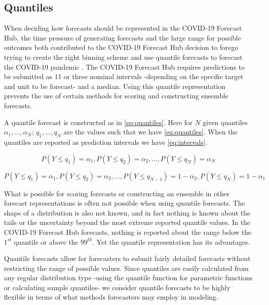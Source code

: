 \documentclass[11pt,notitlepage]{isuthesis}
\begin{document}
\subsection{Quantiles}
When deciding how forecasts should be represented in the COVID-19 Forecast Hub,
the time pressure of generating forecasts and the large
range for possible outcomes both contributed to the COVID-19 Forecast Hub 
decision
to forego trying to create the right binning scheme and use quantile forecasts
to forecast the COVID-19 pandemic \cite[]{bracher2021evaluating}.
The COVID-19 Forecast Hub requires predictions to be submitted as 11 or three 
nominal 
intervals -depending on the specific target and unit to be forecast- 
and a median.
Using this quantile representation prevents the use of certain methods for 
scoring and constructing ensemble forecasts.

A quantile forecast is constructed as in \eqref{eq:quantiles}.
Here for $N$ given quantiles $\alpha_1,..., \alpha_N$; $q_1,..., q_N$ are the 
values such that we have \eqref{eq:quantiles}. 
When the quantiles are reported as prediction intervals we have 
\eqref{eq:intervals}.

\begin{equation}
\label{eq:quantiles}
  P(Y \leq q_1) = \alpha_1, P(Y \leq q_2) = \alpha_2, ..., 
  P(Y \leq q_N) = \alpha_N
\end{equation}


\begin{equation}
\label{eq:intervals}
  P(Y \leq q_1) = \alpha_1, P(Y \leq q_2) = \alpha_2, ...,
  P(Y \leq q_{N-1}) = 1 - \alpha_2, P(Y \leq q_N) = 1 - \alpha_1
\end{equation}

What is possible for scoring forecasts
or constructing an ensemble in other forecast representations is often not 
possible when using
quantile forecasts. The shape of a distribution is also not known, and in fact
nothing is known about the tails or the uncertainty beyond the most 
extreme reported quantile values. In the COVID-19 Forecast Hub forecasts, 
nothing 
is reported about the range below the $1^{st}$ quantile or above the $99^{th}$.
Yet the quantile representation has its advantages. 

Quantile forecasts allow for forecasters to submit fairly detailed
forecasts without restricting the range of possible values.
Since quantiles are easily calculated from any regular distribution type
-using the quantile function for parametric functions or calculating sample 
quantiles- we consider quantile forecasts to be highly flexible in terms of 
what methods forecasters may employ in modeling.
\end{document}
